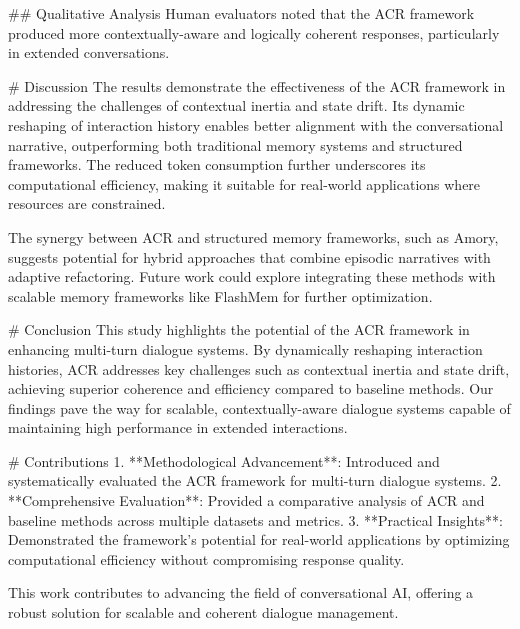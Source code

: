 ## Qualitative Analysis  
Human evaluators noted that the ACR framework produced more contextually-aware and logically coherent responses, particularly in extended conversations.

# Discussion  
The results demonstrate the effectiveness of the ACR framework in addressing the challenges of contextual inertia and state drift. Its dynamic reshaping of interaction history enables better alignment with the conversational narrative, outperforming both traditional memory systems and structured frameworks. The reduced token consumption further underscores its computational efficiency, making it suitable for real-world applications where resources are constrained.

The synergy between ACR and structured memory frameworks, such as Amory, suggests potential for hybrid approaches that combine episodic narratives with adaptive refactoring. Future work could explore integrating these methods with scalable memory frameworks like FlashMem for further optimization.

# Conclusion  
This study highlights the potential of the ACR framework in enhancing multi-turn dialogue systems. By dynamically reshaping interaction histories, ACR addresses key challenges such as contextual inertia and state drift, achieving superior coherence and efficiency compared to baseline methods. Our findings pave the way for scalable, contextually-aware dialogue systems capable of maintaining high performance in extended interactions.

# Contributions  
1. **Methodological Advancement**: Introduced and systematically evaluated the ACR framework for multi-turn dialogue systems.  
2. **Comprehensive Evaluation**: Provided a comparative analysis of ACR and baseline methods across multiple datasets and metrics.  
3. **Practical Insights**: Demonstrated the framework's potential for real-world applications by optimizing computational efficiency without compromising response quality.  

This work contributes to advancing the field of conversational AI, offering a robust solution for scalable and coherent dialogue management.